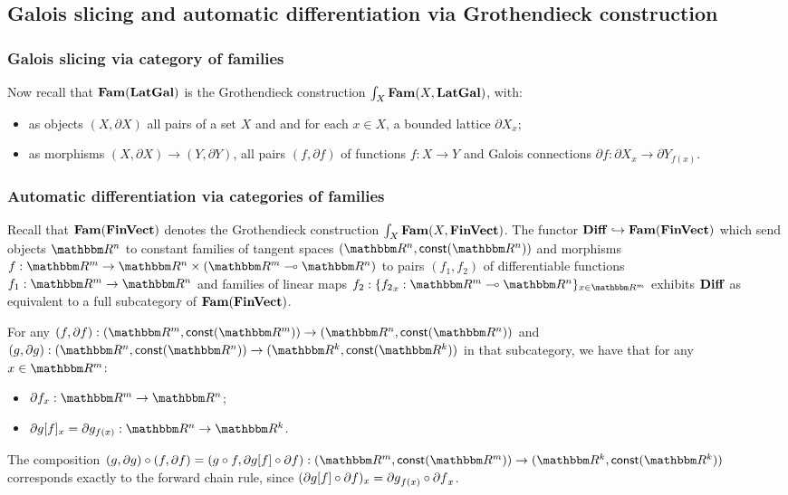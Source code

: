 \subsection{Galois slicing and automatic differentiation via Grothendieck construction}
\label{sec:galois-slicing-auto-diff-via-grothendieck}

\subsubsection{Galois slicing via category of families}
\label{sec:galois-slicing-auto-diff-via-grothendieck:galois-slicing}

Now recall that $\mathbf{Fam}(\mathbf{LatGal})$ is the Grothendieck construction $\int_{X}\mathbf{Fam}(X, \mathbf{LatGal})$, with:
\begin{itemize}
\item as objects $(X, \partial X)$ all pairs of a set $X$ and and for each $x \in X$, a bounded lattice
$\partial X_x$;
\item as morphisms $(X, \partial X) \to (Y, \partial Y)$, all pairs $(f, \partial f)$ of functions $f: X \to
Y$ and Galois connections $\partial f: \partial X_x \to \partial Y_{f(x)}$.
\end{itemize}

\subsubsection{Automatic differentiation via categories of families}
\label{sec:galois-slicing-auto-diff-via-grothendieck:auto-diff}

Recall that $\mathbf{Fam}(\mathbf{FinVect})$ denotes the Grothendieck construction $\int_{X}\mathbf{Fam}(X, \mathbf{FinVect})$. The
functor $\mathbf{Diff} \hookrightarrow \mathbf{Fam}(\mathbf{FinVect})$ which send objects $\RR^n$ to constant families of tangent
spaces $(\RR^n, \const(\RR^n))$ and morphisms $f: \RR^m \to \RR^n \times (\RR^m \linearto \RR^n)$ to pairs
$(f_1, f_2)$ of differentiable functions $f_1: \RR^m \to \RR^n$ and families of linear maps $f_2: \{{f_2}_x:
\RR^m \linearto \RR^n\}_{x \in \RR^m}$ exhibits $\mathbf{Diff}$ as equivalent to a full subcategory of
$\mathbf{Fam}(\mathbf{FinVect})$.

For any $(f, \partial f): (\RR^m, \const(\RR^m)) \to (\RR^n, \const(\RR^n))$ and $(g, \partial g): (\RR^n,
\const(\RR^n)) \to (\RR^k, \const(\RR^k))$ in that subcategory, we have that for any $x \in \RR^m$:
\begin{itemize}
\item $\partial f_x: \RR^m \to \RR^n$;
\item $\reindex{\partial g}{f}_x = \partial g_{f(x)}: \RR^n \to \RR^k$.
\end{itemize}

\noindent The composition $(g, \partial g) \comp (f, \partial f) = (g \comp f, \reindex{\partial g}{f} \comp
\partial f): (\RR^m, \const(\RR^m)) \to (\RR^k, \const(\RR^k))$ corresponds exactly to the forward chain rule,
since $(\partial g[f] \circ \partial f)_x = {\partial g}_{f(x)} \circ {\partial f}_x$.
